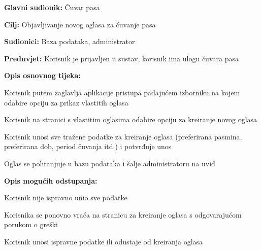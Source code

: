 					\noindent {}
					\begin{packed_item}
						
						\item \textbf{Glavni sudionik: } Čuvar pasa
						\item  \textbf{Cilj:} Objavljivanje novog oglasa za čuvanje pasa
						\item  \textbf{Sudionici:} Baza podataka, administrator
						\item  \textbf{Preduvjet:} Korisnik je prijavljen u sustav, korisnik ima ulogu čuvara pasa
						\item  \textbf{Opis osnovnog tijeka:}
						
						\item[] \begin{packed_enum}
							
							\item Korisnik putem zaglavlja aplikacije pristupa padajućem izborniku na kojem odabire opciju za prikaz vlastitih oglasa
							\item Korisnik na stranici s vlastitim oglasima odabire opciju za kreiranje novog oglasa
							\item Korisnik unosi sve tražene podatke za kreiranje oglasa (preferirana pasmina, preferirana dob, period čuvanja itd.) i potvrđuje unos
							\item Oglas se pohranjuje u bazu podataka i šalje administratoru na uvid
							
						\end{packed_enum}
						
						\item  \textbf{Opis mogućih odstupanja:}
						
						\item[] \begin{packed_item}
							
							\item[3.a] Korisnik nije ispravno unio sve podatke
							\item[] \begin{packed_enum}
								
								\item Korisnika se ponovno vraća na stranicu za kreiranje oglasa s odgovarajućom porukom o greški 
								\item Korisnik unosi ispravne podatke ili odustaje od kreiranja oglasa
								
							\end{packed_enum}
						\end{packed_item}
					\end{packed_item}	
				
